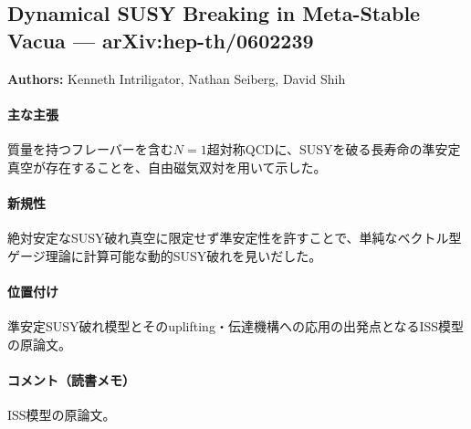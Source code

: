\subsection{Dynamical SUSY Breaking in Meta-Stable Vacua --- arXiv:hep-th/0602239}

\textbf{Authors:} Kenneth Intriligator, Nathan Seiberg, David Shih

\paragraph{主な主張}
質量を持つフレーバーを含む$N=1$超対称QCDに、SUSYを破る長寿命の準安定真空が存在することを、自由磁気双対を用いて示した\cite{Intriligator:2006dd}。

\paragraph{新規性}
絶対安定なSUSY破れ真空に限定せず準安定性を許すことで、単純なベクトル型ゲージ理論に計算可能な動的SUSY破れを見いだした。

\paragraph{位置付け}
準安定SUSY破れ模型とそのuplifting・伝達機構への応用の出発点となるISS模型の原論文。

\paragraph{コメント（読書メモ）}
ISS模型の原論文。
